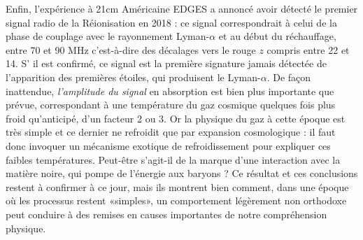 Enfin, l'expérience à 21cm Américaine EDGES  a annoncé avoir détecté le premier signal radio de la Réionisation en 2018 : ce signal correspondrait à celui de la phase de couplage avec le rayonnement Lyman-$\alpha$ et au début du réchauffage, entre 70 et 90 MHz c'est-à-dire des décalages vers le rouge $z$ compris entre 22 et 14. S’ il est confirmé, ce signal est la première signature jamais détectée de l'apparition des premières étoiles, qui produisent le Lyman-$\alpha$. De façon inattendue, \textit{l'amplitude du signal} en absorption est bien plus importante que prévue, correspondant à une température du gaz cosmique quelques fois plus froid qu'anticipé, d'un facteur 2 ou 3. Or la physique du gaz à cette époque est très simple et ce dernier ne refroidit que par expansion cosmologique : il faut donc invoquer un mécanisme exotique de refroidissement pour expliquer ces faibles températures. Peut-être s'agit-il de la marque d'une interaction avec la matière noire, qui pompe de l'énergie aux baryons ? Ce résultat et ces conclusions restent à confirmer à ce jour, mais ils montrent bien comment, dans une époque où les processus restent «simples», un comportement légèrement non orthodoxe peut conduire à des remises en causes importantes de notre compréhension physique.  
  
 
